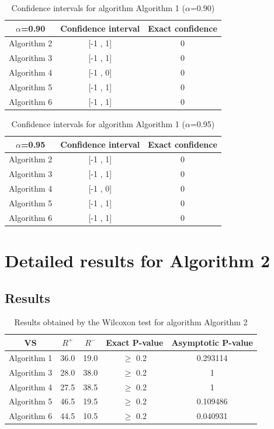 \documentclass[a4paper,10pt]{article}
\begin{document}
\begin{table}[!htp]
\centering\small
\begin{tabular}{
|c|c|c|}
\hline
 $\alpha$=0.90 & Confidence interval & Exact confidence \\ \hline 
Algorithm 2 & [-1 , 1] & 0\\ \hline 
Algorithm 3 & [-1 , 1] & 0\\ \hline 
Algorithm 4 & [-1 , 0] & 0\\ \hline 
Algorithm 5 & [-1 , 1] & 0\\ \hline 
Algorithm 6 & [-1 , 1] & 0\\ \hline 

\end{tabular}
\caption{Confidence intervals for algorithm Algorithm 1 ($\alpha$=0.90)}
\end{table}
\begin{table}[!htp]
\centering\small
\begin{tabular}{
|c|c|c|}
\hline
 $\alpha$=0.95 & Confidence interval & Exact confidence \\ \hline 
Algorithm 2 & [-1 , 1] & 0\\ \hline 
Algorithm 3 & [-1 , 1] & 0\\ \hline 
Algorithm 4 & [-1 , 0] & 0\\ \hline 
Algorithm 5 & [-1 , 1] & 0\\ \hline 
Algorithm 6 & [-1 , 1] & 0\\ \hline 

\end{tabular}
\caption{Confidence intervals for algorithm Algorithm 1 ($\alpha$=0.95)}
\end{table}

 \clearpage 


\section{Detailed results for Algorithm 2}


\subsection{Results}

\begin{table}[!htp]
\centering\small
\begin{tabular}{
|c|c|c|c|c|}
\hline
 VS & $R^{+}$ & $R^{-}$ & Exact P-value & Asymptotic P-value \\ \hline 
Algorithm 1 & 36.0 & 19.0 & $\geq$ 0.2 & 0.293114\\ \hline 
Algorithm 3 & 28.0 & 38.0 & $\geq$ 0.2 & 1\\ \hline 
Algorithm 4 & 27.5 & 38.5 & $\geq$ 0.2 & 1\\ \hline 
Algorithm 5 & 46.5 & 19.5 & $\geq$ 0.2 & 0.109486\\ \hline 
Algorithm 6 & 44.5 & 10.5 & $\geq$ 0.2 & 0.040931\\ \hline 

\end{tabular}
\caption{Results obtained by the Wilcoxon test for algorithm Algorithm 2}
\end{table}
\end{document}
